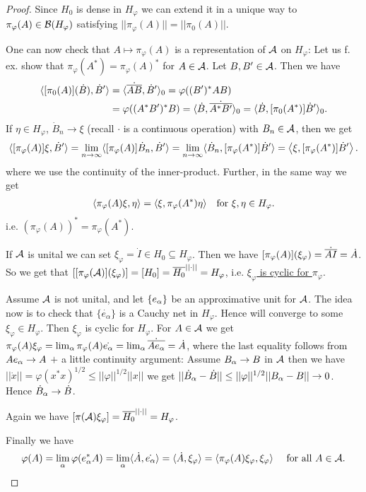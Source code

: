 \documentclass[10pt,english,a4paper]{article}
\theoremstyle{definition}
\def\dA{\dot{A}}
\def\dB{\dot{B}}
\def\eal{e_{\alpha}}
\def\dA{\dot{A}}
\def\dB{\dot{B}}
\def\vphi{\varphi}
\begin{document}
\begin{proof}
Since $H_0$
is dense in $H_{\vphi}$ we can extend it in a unique way to $\pi_{\vphi}(A) \in \Bs(H_{\vphi})$
satisfying $||\pi_{\vphi}(A)|| = ||\pi_0(A)||$.

One can now check that $A \mapsto \pi_{\vphi} (A)$ is a representation of $\mathcal{A}$
on $H_{\vphi}$:
Let us f. ex. show that $\pi_{\vphi}(A^*) = \pi_{\vphi}(A)^*$ for $A \in \mathcal{A}$.
Let $B,B' \in \mathcal{A}$. Then we have 
\begin{align*}
    \indi{[\pi_{0}(A)](\dB), \dB'} &= \indi{\dot{\ol{AB}},\dB'}_0 =
\vphi((B')^*AB) \\
&= \vphi((A^*B')^*B) = \indi{\dB, \dot{\ol{A^*B'}}}_0 = \indi{\dB, [\pi_0(A^*)]\dB'}_0.
\end{align*}
If $\eta \in H_{\vphi}$, $\dB_n \to \xi$ (recall $\cdot$ is a continuous operation) with $B_n \in \mathcal{A}$,
then we get 
\begin{align*}
    \indi{[\pi_{\vphi}(A)]\xi,\dB'} = \lim_{n\to\infty} \indi{[\pi_{\vphi}(A)]\dB_n, \dB'}
= \lim_{n\to\infty} \indi{\dB_n, [\pi_{\vphi}(A^*)]\dB'} = \ind{\xi,[\pi_{\vphi}(A^*)]\dB'}.
\end{align*}
where we use the continuity of the inner-product. Further, in the same way we get
\begin{align*}
    \indi{\pi_{\vphi}(A)\xi,\eta} = \indi{\xi, \pi_{\vphi}(A^*)\eta} \quad \text{for }
\xi,\eta\in H_{\vphi}.
\end{align*}
i.e. \ul{$(\pi_{\vphi}(A))^* = \pi_{\vphi}(A^*)$}.

If $\mathcal{A}$ is unital we can set $\xi_{\vphi} = \dot{I} \in H_0 \subseteq
H_{\vphi}$.  Then we have $[\pi_{\vphi}(A)](\xi_{\vphi}) = \dot{\ol{AI}} =
\dA$.  So we get that $\left[[\pi_{\vphi}(\As)](\xi_{\vphi})\right]  = [H_0] =
\ol{H_0}^{||\cdot||} = H_{\vphi}$, i.e. \ul{$\xi_{\vphi}$ is cyclic for
$\pi_{\vphi}$}.

Assume $\mathcal{A}$ is not unital, and let $\{e_{\alpha}\}$ be an approximative unit for $\mathcal{A}$.
The idea now is to check that $\{\dot{\eal}\}$ is a Cauchy net in $H_{\vphi}$.
Hence will converge to some $\xi_{\vphi} \in H_{\vphi}$. Then $\xi_{\vphi}$ is cyclic 
for $H_{\vphi}$.
For $A \in \mathcal{A}$ we get $\pi_{\vphi}(A)\xi_{\vphi} = \lim_{\al} \pi_{\vphi}(A)\dot{\eal} = 
\lim_{\al} \dot{\ol{Ae_{\al}}} = \dA$,
where the last equality follows from $Ae_{\alpha}\to A$ $+$ a little
continuity argument: Assume $B_{\alpha}\to B$ in $\mathcal{A}$ then we have 
$||\dot{x}|| = \vphi(x^*x)^{1/2} \leq ||\vphi||^{1/2}||x||$ we get 
$||\dB_{\al} - \dB|| \leq ||\vphi||^{1/2} ||B_{\al} - B|| \to 0$. Hence 
$\dB_{\al}\to \dB$.

Again we have $[\pi(\As)\xi_{\vphi}] = \ol{H_0}^{||\cdot||} = H_{\vphi}$.

Finally we have
\begin{align*}
    \vphi(A) =\lim_{\al} \vphi(e^{*}_{\al}A) = \lim_{\al} \indi{\dA,\dot{\eal}} = \indi{\dA, \xi_{\vphi}}
= \indi{\pi_{\vphi}(A)\xi_{\vphi},\xi_{\vphi}} \quad\text{ for all }A \in \As.
\end{align*}

\end{proof}
\end{document}
